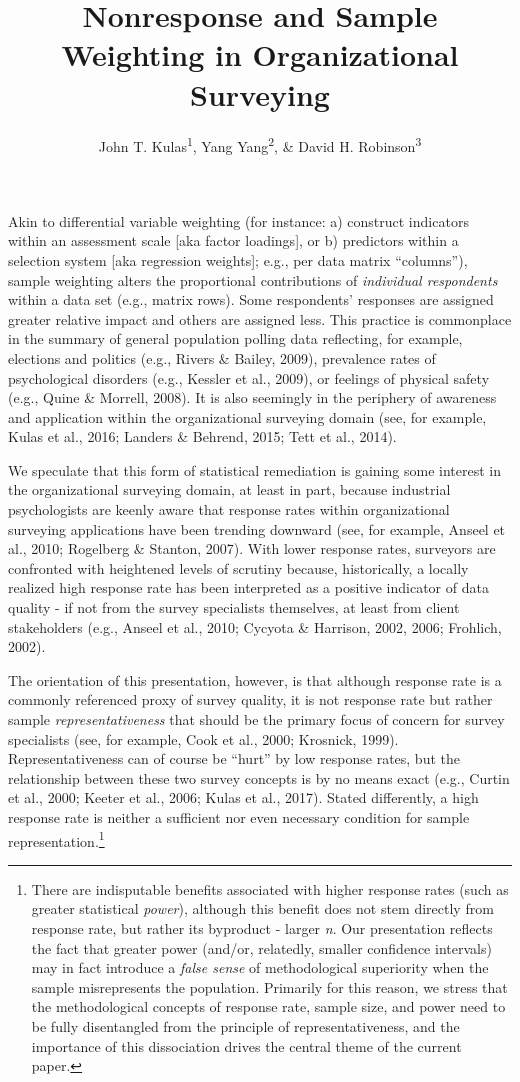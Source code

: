 \documentclass[
  man,floatsintext]{apa7}
\title{Nonresponse and Sample Weighting in Organizational Surveying}
\author{John T. Kulas\textsuperscript{1}, Yang Yang\textsuperscript{2}, \& David H. Robinson\textsuperscript{3}}
\date{}
\affiliation{\vspace{0.5cm}\textsuperscript{1} Montclair State University\\\textsuperscript{2} China Select\\\textsuperscript{3} St.~Cloud State University}
\begin{document}
\maketitle

Akin to differential variable weighting (for instance: a) construct indicators within an assessment scale {[}aka factor loadings{]}, or b) predictors within a selection system {[}aka regression weights{]}; e.g., per data matrix ``columns''), sample weighting alters the proportional contributions of \emph{individual respondents} within a data set (e.g., matrix rows). Some respondents' responses are assigned greater relative impact and others are assigned less. This practice is commonplace in the summary of general population polling data reflecting, for example, elections and politics (e.g., Rivers \& Bailey, 2009), prevalence rates of psychological disorders (e.g., Kessler et al., 2009), or feelings of physical safety (e.g., Quine \& Morrell, 2008). It is also seemingly in the periphery of awareness and application within the organizational surveying domain (see, for example, Kulas et al., 2016; Landers \& Behrend, 2015; Tett et al., 2014).

We speculate that this form of statistical remediation is gaining some interest in the organizational surveying domain, at least in part, because industrial psychologists are keenly aware that response rates within organizational surveying applications have been trending downward (see, for example, Anseel et al., 2010; Rogelberg \& Stanton, 2007). With lower response rates, surveyors are confronted with heightened levels of scrutiny because, historically, a locally realized high response rate has been interpreted as a positive indicator of data quality - if not from the survey specialists themselves, at least from client stakeholders (e.g., Anseel et al., 2010; Cycyota \& Harrison, 2002, 2006; Frohlich, 2002).

The orientation of this presentation, however, is that although response rate is a commonly referenced proxy of survey quality, it is not response rate but rather sample \emph{representativeness} that should be the primary focus of concern for survey specialists (see, for example, Cook et al., 2000; Krosnick, 1999). Representativeness can of course be ``hurt'' by low response rates, but the relationship between these two survey concepts is by no means exact (e.g., Curtin et al., 2000; Keeter et al., 2006; Kulas et al., 2017). Stated differently, a high response rate is neither a sufficient nor even necessary condition for sample representation.\footnote{There are indisputable benefits associated with higher response rates (such as greater statistical \emph{power}), although this benefit does not stem directly from response rate, but rather its byproduct - larger \emph{n}. Our presentation reflects the fact that greater power (and/or, relatedly, smaller confidence intervals) may in fact introduce a \emph{false sense} of methodological superiority when the sample misrepresents the population. Primarily for this reason, we stress that the methodological concepts of response rate, sample size, and power need to be fully disentangled from the principle of representativeness, and the importance of this dissociation drives the central theme of the current paper.}
\end{document}
